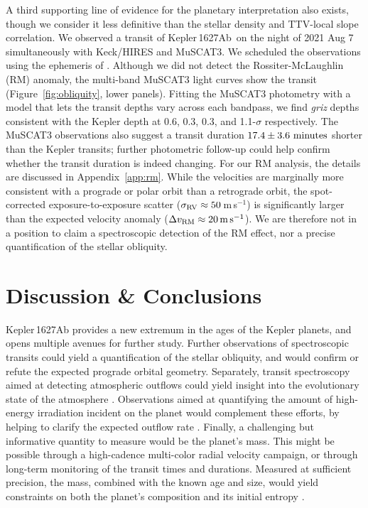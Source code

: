 \documentclass[12pt,modern,twocolumn,tighten]{aastex63}
\newcommand{\pn}{Kepler\,1627Ab} %
\newcommand{\ms}{\,m\,s$^{-1}$}
\begin{document}
A third supporting line of evidence for the planetary interpretation
also exists, though we consider it less definitive than the stellar
density and TTV-local slope correlation.  We observed a transit of
\pn\ on the night of 2021 Aug 7 simultaneously with Keck/HIRES and
MuSCAT3.  We scheduled the observations using the ephemeris of
\citet{holczer_transit_2016}.  Although we did not detect the
Rossiter-McLaughlin (RM) anomaly, the multi-band MuSCAT3 light curves
show the transit (Figure~\ref{fig:obliquity}, lower panels).  Fitting
the MuSCAT3 photometry with a model that lets the transit depths vary
across each bandpass, we find {\it griz} depths consistent with the
Kepler depth at 0.6, 0.3, 0.3, and 1.1-$\sigma$ respectively.  The
MuSCAT3 observations also suggest a transit duration $17.4\pm3.6\ {\rm
minutes}$ shorter than the Kepler transits; further photometric
follow-up could help confirm whether the transit duration is indeed
changing.  For our RM analysis, the details are discussed in
Appendix~\ref{app:rm}.  While the velocities are marginally more
consistent with a prograde or polar orbit than a retrograde orbit, the
spot-corrected exposure-to-exposure scatter ($\sigma_{\rm RV}\approx
50$\ms) is significantly larger than the expected velocity anomaly
($\Delta v_{\rm RM}\approx 20\,{\rm m\,s}^{-1}$).  We are therefore
not in a position to claim a spectroscopic detection of the RM effect,
nor a precise quantification of the stellar obliquity.


\section{Discussion \& Conclusions}
\label{sec:conc}

Kepler\,1627Ab provides a new extremum in the ages of the Kepler
planets, and opens multiple avenues for further study.  Further
observations of spectroscopic transits could yield a quantification of
the stellar obliquity, and would confirm or refute the expected
prograde orbital geometry.  Separately, transit spectroscopy aimed at
detecting atmospheric outflows could yield insight into the
evolutionary state of the atmosphere \citep[{\it
e.g.},][]{ehrenreich_giant_2015,spake_helium_2018,vissapragada_2020}.
Observations aimed at quantifying the amount of high-energy
irradiation incident on the planet would complement these efforts, by
helping to clarify the expected outflow rate \citep[{\it
e.g.},][]{poppenhaeger_2021}.  Finally, a challenging but informative
quantity to measure would be the planet's mass.  This might be
possible through a high-cadence multi-color radial velocity campaign,
or through long-term monitoring of the transit times and durations.
Measured at sufficient precision, the mass, combined with the known
age and size, would yield constraints on both the planet's composition
and its initial entropy \citep{owen_constraining_2020}.
\end{document}
